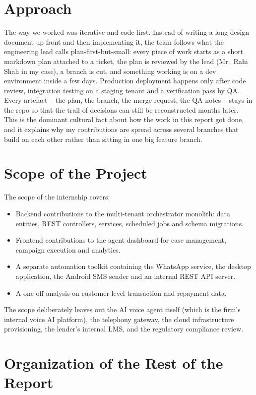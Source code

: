 \section{Approach}
The way we worked was iterative and code-first. Instead of writing a long design document up front and then implementing it, the team follows what the engineering lead calls plan-first-but-small: every piece of work starts as a short markdown plan attached to a ticket, the plan is reviewed by the lead (Mr.~Rahi Shah in my case), a branch is cut, and something working is on a dev environment inside a few days. Production deployment happens only after code review, integration testing on a staging tenant and a verification pass by QA. Every artefact -- the plan, the branch, the merge request, the QA notes -- stays in the repo so that the trail of decisions can still be reconstructed months later. This is the dominant cultural fact about how the work in this report got done, and it explains why my contributions are spread across several branches that build on each other rather than sitting in one big feature branch.

\section{Scope of the Project}
The scope of the internship covers:
\begin{itemize}
\item Backend contributions to the multi-tenant orchestrator monolith: data entities, REST controllers, services, scheduled jobs and schema migrations.
\item Frontend contributions to the agent dashboard for case management, campaign execution and analytics.
\item A separate automation toolkit containing the WhatsApp service, the desktop application, the Android SMS sender and an internal REST API server.
\item A one-off analysis on customer-level transaction and repayment data.
\end{itemize}

The scope deliberately leaves out the AI voice agent itself (which is the firm's internal voice AI platform), the telephony gateway, the cloud infrastructure provisioning, the lender's internal LMS, and the regulatory compliance review.

\section{Organization of the Rest of the Report}

